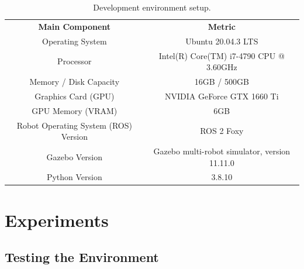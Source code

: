 \documentclass[12pt,oneside]{article}
\begin{document}
\begin{table}[H]
\centering
\begin{tabular}{ | c | c | }
\hline
\rowcolor{gray!50}
\multicolumn{2}{|c|}{\textbf{Environment Setup}} \\
\hline
\rowcolor{gray!25}
\textbf{Main Component} & \textbf{Metric} \\
\hline
Operating System & Ubuntu 20.04.3 LTS \\
\rowcolor{gray!10}
Processor & Intel(R) Core(TM) i7-4790 CPU @ 3.60GHz \\
Memory / Disk Capacity & 16GB / 500GB \\
\rowcolor{gray!10}
Graphics Card (GPU) & NVIDIA GeForce GTX 1660 Ti \\
GPU Memory (VRAM) & 6GB \\
\rowcolor{gray!10}
Robot Operating System (ROS) Version & ROS 2 Foxy \\
Gazebo Version & Gazebo multi-robot simulator, version 11.11.0 \\
\rowcolor{gray!10}
Python Version & 3.8.10 \\

\hline
\end{tabular}
\caption{Development environment setup.}
\label{table:hardware-specs}
\end{table}





\section{Experiments}\label{experiments}
\subsection{Testing the Environment}\label{experiment:testing-the-environment}
\end{document}
